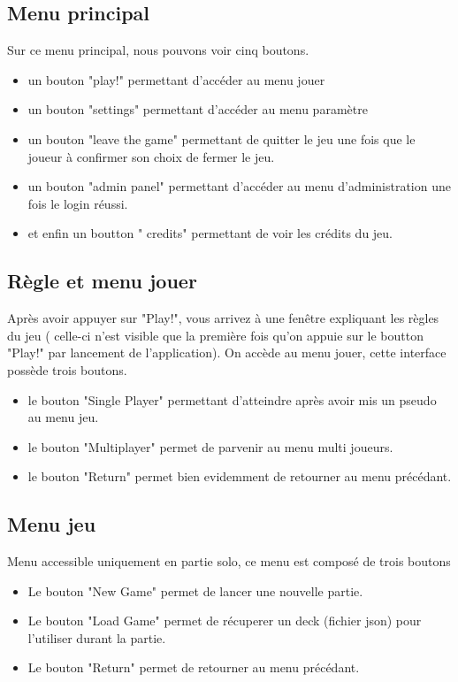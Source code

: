 \subsection{Menu principal}
Sur ce menu principal, nous pouvons voir cinq boutons. 
\begin{itemize}
	\item un bouton "play!" permettant d'accéder au menu jouer
	\item un bouton "settings" permettant d'accéder au menu paramètre
	\item un bouton "leave the game" permettant de quitter le jeu une fois que le joueur à confirmer son choix de 
		fermer le jeu.
	\item un bouton "admin panel" permettant d'accéder au menu d'administration une fois le login réussi.
	\item et enfin un boutton " credits" permettant de voir les crédits du jeu.
\end{itemize}

\subsection{Règle et menu jouer}
Après avoir appuyer sur "Play!", vous arrivez à une fenêtre expliquant les règles du jeu ( celle-ci n'est 
visible que la première fois qu'on appuie sur le boutton "Play!" par lancement de l'application). On accède 
au menu jouer, cette interface possède trois boutons. 
\begin{itemize}
	\item le bouton "Single Player" permettant d'atteindre après avoir mis un pseudo au menu jeu.
	\item le bouton "Multiplayer" permet de parvenir au menu multi joueurs.
	\item le bouton "Return" permet bien evidemment de retourner au menu précédant.
\end{itemize}

\subsection{Menu jeu}
Menu accessible uniquement en partie solo, ce menu est composé de trois boutons 
\begin{itemize}
	\item Le bouton "New Game" permet de lancer une nouvelle partie.
	\item Le bouton "Load Game" permet de récuperer un deck (fichier json) pour l'utiliser durant la partie.
	\item Le bouton "Return" permet de retourner au menu précédant.
\end{itemize}

